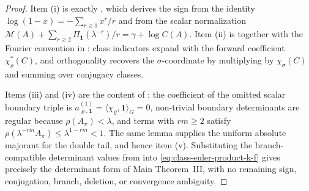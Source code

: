 \documentclass[11pt,a4paper]{amsart}
\theoremstyle{plain}
\theoremstyle{definition}
\theoremstyle{remark}
\begin{document}
\begin{proof}
  Item \textup{(i)} is exactly
  , which derives the
  sign from the identity
  \(\log(1-x)=-\sum_{r\ge1}x^r/r\) and from the scalar normalization
  \(\mathcal M(A)+\sum_{r\ge2}\Pi_{\mathbf1}(\lambda^{-r})/r
  =\gamma+\log C(A)\).  Item \textup{(ii)} is
   together with the
  Fourier convention in : class indicators expand with
  the forward coefficient \(\chi_\varrho^\ast(C)\), and orthogonality recovers
  the \(\sigma\)-coordinate by multiplying by \(\chi_\sigma(C)\) and summing
  over conjugacy classes.

  Items \textup{(iii)} and \textup{(iv)} are the content of
  : the coefficient of the
  omitted scalar boundary triple is
  \(a_{\varrho,\mathbf1}^{(1)}=\langle\chi_\varrho,\mathbf1\rangle_G=0\),
  non-trivial boundary determinants are regular because
  \(\rho(A_\pi)<\lambda\), and terms with \(rm\ge2\) satisfy
  \(\rho(\lambda^{-rm}A_\pi)\le\lambda^{1-rm}<1\).  The same lemma supplies
  the uniform absolute majorant for the double tail, and hence item
  \textup{(v)}.  Substituting the branch-compatible determinant values from
   into
  \eqref{eq:class-euler-product-k-f} gives precisely the determinant form of
  Main Theorem~III, with no remaining sign, conjugation, branch, deletion, or
  convergence ambiguity.
\end{proof}
\end{document}
